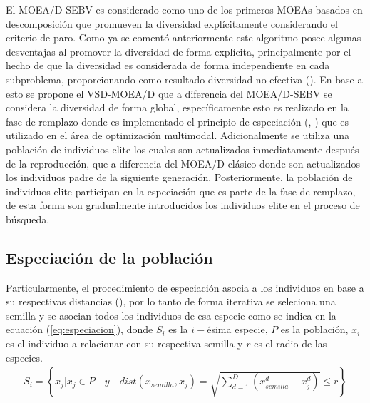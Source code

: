 El MOEA/D-SEBV es considerado como uno de los primeros MOEAs basados en descomposición que promueven la diversidad explícitamente considerando el criterio de paro.
%
Como ya se comentó anteriormente este algoritmo posee algunas desventajas al promover la diversidad de forma explícita, principalmente por el hecho de que la diversidad es considerada de forma independiente en cada subproblema, proporcionando como resultado diversidad no efectiva (\cite{Joel:mahfoud1995niching}).
%
En base a esto se propone el VSD-MOEA/D que a diferencia del MOEA/D-SEBV se considera la diversidad de forma global, específicamente esto es realizado en la fase de remplazo donde es implementado el principio de especiación (\cite{yang2017multimodal}, \cite{gao2014cluster}) que es utilizado en el área de optimización multimodal.
%
Adicionalmente se utiliza una población de individuos elite los cuales son actualizados inmediatamente después de la reproducción, que a diferencia del MOEA/D clásico donde son actualizados los individuos padre de la siguiente generación.
%
Posteriormente, la población de individuos elite participan en la especiación que es parte de la fase de remplazo, de esta forma son gradualmente introducidos los individuos elite en el proceso de búsqueda.
%

\subsection{Especiación de la población}

Particularmente, el procedimiento de especiación asocia a los individuos en base a su respectivas distancias (\cite{li2005efficient}), por lo tanto de forma iterativa se seleciona una semilla y se asocian todos los individuos de esa especie como se indica en la ecuación (\ref{eq:especiacion}), donde $S_i$ es la $i-$ésima especie, $P$ es la población, $x_i$ es el individuo a relacionar con su respectiva semilla y $r$ es el radio de las especies.
%
\begin{equation}\label{eq:especiacion}
\begin{split}
S_i = \left \{ x_j | x_j \in P \quad y \quad dist(x_{semilla}, x_j) = \sqrt{ \sum_{d=1}^D ( x_{semilla}^d - x_j^d )  } \leq r \right \}
\end{split}
\end{equation} 


